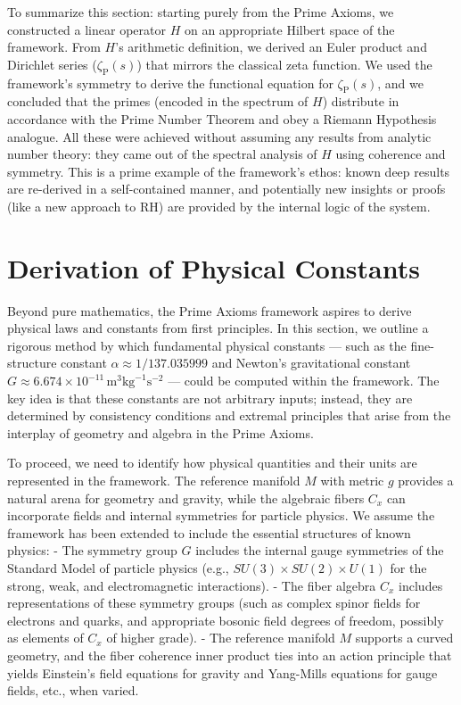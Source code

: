 \documentclass[11pt]{article}
\begin{document}
To summarize this section: starting purely from the Prime Axioms, we constructed a linear operator $H$ on an appropriate Hilbert space of the framework. From $H$'s arithmetic definition, we derived an Euler product and Dirichlet series ($\zeta_{\mathrm{P}}(s)$) that mirrors the classical zeta function. We used the framework's symmetry to derive the functional equation for $\zeta_{\mathrm{P}}(s)$, and we concluded that the primes (encoded in the spectrum of $H$) distribute in accordance with the Prime Number Theorem and obey a Riemann Hypothesis analogue. All these were achieved without assuming any results from analytic number theory: they came out of the spectral analysis of $H$ using coherence and symmetry. This is a prime example of the framework’s ethos: known deep results are re-derived in a self-contained manner, and potentially new insights or proofs (like a new approach to RH) are provided by the internal logic of the system.

\section{Derivation of Physical Constants}

Beyond pure mathematics, the Prime Axioms framework aspires to derive physical laws and constants from first principles. In this section, we outline a rigorous method by which fundamental physical constants — such as the fine-structure constant $\alpha \approx 1/137.035999$ and Newton's gravitational constant $G \approx 6.674\times10^{-11}\,\text{m}^3\text{kg}^{-1}\text{s}^{-2}$ — could be computed within the framework. The key idea is that these constants are not arbitrary inputs; instead, they are determined by consistency conditions and extremal principles that arise from the interplay of geometry and algebra in the Prime Axioms.

To proceed, we need to identify how physical quantities and their units are represented in the framework. The reference manifold $M$ with metric $g$ provides a natural arena for geometry and gravity, while the algebraic fibers $C_x$ can incorporate fields and internal symmetries for particle physics. We assume the framework has been extended to include the essential structures of known physics:
- The symmetry group $G$ includes the internal gauge symmetries of the Standard Model of particle physics (e.g., $SU(3)\times SU(2)\times U(1)$ for the strong, weak, and electromagnetic interactions).
- The fiber algebra $C_x$ includes representations of these symmetry groups (such as complex spinor fields for electrons and quarks, and appropriate bosonic field degrees of freedom, possibly as elements of $C_x$ of higher grade).
- The reference manifold $M$ supports a curved geometry, and the fiber coherence inner product ties into an action principle that yields Einstein's field equations for gravity and Yang-Mills equations for gauge fields, etc., when varied.
\end{document}
